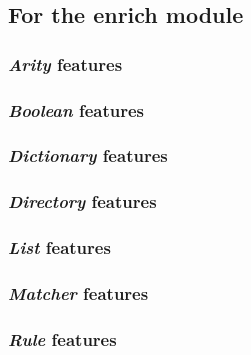 \documentclass[12pt]{article}
\begin{document}
        \subsection{For the enrich module}
        \label{subsec:config-enrich}
        

            \subsubsection{\textit{Arity} features}
            \label{subsubsec:feature-arity}
            

            \subsubsection{\textit{Boolean} features}
            \label{subsubsec:feature-boolean}
            

            \subsubsection{\textit{Dictionary} features}
            \label{subsubsec:feature-dictionary}
            

            \subsubsection{\textit{Directory} features}
            \label{subsubsec:feature-directory}
            

            \subsubsection{\textit{List} features}
            \label{subsubsec:feature-list}
            

            \subsubsection{\textit{Matcher} features}
            \label{subsubsec:feature-matcher}
            

            \subsubsection{\textit{Rule} features}
            \label{subsubsec:feature-rule}
            
\end{document}
